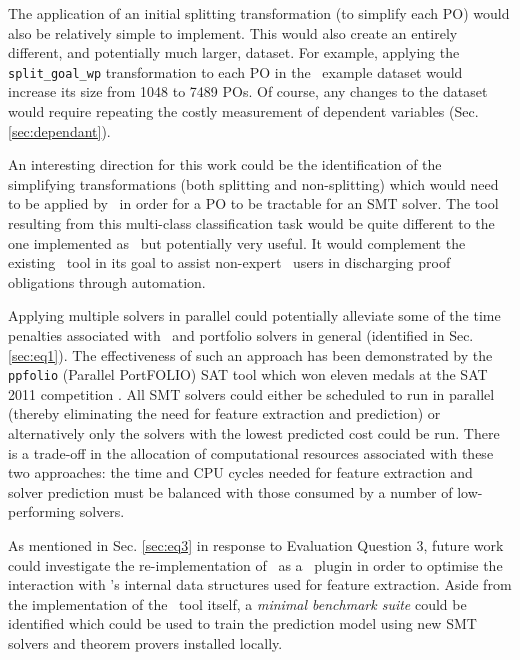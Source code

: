 The application of an initial splitting transformation (to simplify each PO) would also be relatively simple to implement.
This would also create an entirely different, and potentially much larger, dataset. 
For example, applying the \texttt{split\_goal\_wp} transformation to each PO in the \why~example dataset would increase its size from 1048 to 7489 POs.
Of course, any changes to the dataset would require repeating the costly measurement of dependent variables (Sec. \ref{sec:dependant}).

An interesting direction for this work could be the identification of the simplifying transformations (both splitting and non-splitting) which would need to be applied by \why~in order for a PO to be tractable for an SMT solver.
The tool resulting from this multi-class classification task would be quite different to the one implemented as \where~but potentially very useful.
It would complement the existing \where~tool in its goal to assist non-expert \why~users in discharging proof obligations through automation.

Applying multiple solvers in parallel could potentially alleviate some of the time penalties associated with \where~and portfolio solvers in general (identified in Sec. \ref{sec:eq1}).
The effectiveness of such an approach has been demonstrated by the \texttt{ppfolio} (Parallel PortFOLIO) SAT tool which won eleven medals at the SAT 2011 competition \cite{Malitsky2012}.
All SMT solvers could either be scheduled to run in parallel (thereby eliminating the need for feature extraction and prediction) or alternatively only the solvers with the lowest predicted cost could be run.
There is a trade-off in the allocation of computational resources associated with these two approaches: the time and CPU cycles needed for feature extraction and solver prediction must be balanced with those consumed by a number of low-performing solvers.     
 
As mentioned in Sec. \ref{sec:eq3} in response to Evaluation Question 3, future work could investigate the re-implementation of \where~as a \why~plugin in order to optimise the interaction with \why's internal data structures used for feature extraction.
Aside from the implementation of the \where~tool itself, a
\textit{minimal benchmark suite} could be identified which could be used to train the prediction model using new SMT solvers and theorem provers installed locally.
